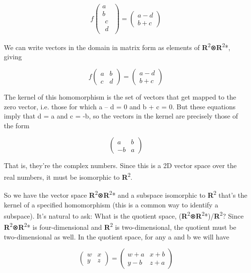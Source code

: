 \documentclass[oneside,english]{amsbook}
\numberwithin{section}{chapter}
\theoremstyle{plain}
\theoremstyle{definition}
\begin{document}
\[f\begin{pmatrix}
	a \\
	b \\
	\begin{matrix}
		c \\
		d
	\end{matrix}
\end{pmatrix} = \begin{pmatrix}
	a - d \\
	b + c
\end{pmatrix}\]

We can write vectors in the domain in matrix form as elements of
\textbf{R}\textsuperscript{2}⊗\textbf{R}\textsuperscript{2}*, giving

\[f\begin{pmatrix}
	a & b \\
	c & d
\end{pmatrix} = \begin{pmatrix}
	a - d \\
	b + c
\end{pmatrix}\]

The kernel of this homomorphism is the set of vectors that get mapped to
the zero vector, i.e. those for which a -- d = 0 and b + c = 0. But
these equations imply that d = a and c = -b, so the vectors in the
kernel are precisely those of the form

\[\begin{pmatrix}
	a & b \\
	- b & a
\end{pmatrix}\]

That is, they're the complex numbers. Since this is a 2D vector space
over the real numbers, it must be isomorphic to
\textbf{R}\textsuperscript{2}.

So we have the vector space
\textbf{R}\textsuperscript{2}⊗\textbf{R}\textsuperscript{2}* and a
subspace isomorphic to \textbf{R}\textsuperscript{2} that's the kernel
of a specified homomorphism (this is a common way to identify a
subspace). It's natural to ask: What is the quotient space,
(\textbf{R}\textsuperscript{2}⊗\textbf{R}\textsuperscript{2}*)/\textbf{R}\textsuperscript{2}?
Since \textbf{R}\textsuperscript{2}⊗\textbf{R}\textsuperscript{2}* is
four-dimensional and \textbf{R}\textsuperscript{2} is two-dimensional,
the quotient must be two-dimensional as well. In the quotient space, for
any a and b we will have

\[\begin{pmatrix}
	w & x \\
	y & z
\end{pmatrix} = \begin{pmatrix}
	w + a & x + b \\
	y - b & z + a
\end{pmatrix}\]
\end{document}
